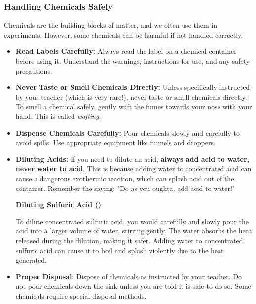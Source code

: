 \subsubsection{Handling Chemicals Safely}

Chemicals are the building blocks of matter, and we often use them in experiments. However, some chemicals can be harmful if not handled correctly.

\begin{itemize}
    \item \textbf{Read Labels Carefully:}  Always read the label on a chemical container before using it. Understand the warnings, instructions for use, and any safety precautions.
    \item \textbf{Never Taste or Smell Chemicals Directly:}  Unless specifically instructed by your teacher (which is very rare!), never taste or smell chemicals directly.  To smell a chemical safely, gently waft the fumes towards your nose with your hand. This is called \textit{wafting}.
    \item \textbf{Dispense Chemicals Carefully:}  Pour chemicals slowly and carefully to avoid spills. Use appropriate equipment like funnels and droppers.
    \item \textbf{Diluting Acids:} If you need to dilute an acid, \textbf{always add acid to water, never water to acid}. This is because adding water to concentrated acid can cause a dangerous exothermic reaction, which can splash acid out of the container. Remember the saying: "Do as you oughta, add acid to water!"
    \begin{example}
        \textbf{Diluting Sulfuric Acid ()}

        To dilute concentrated sulfuric acid, you would carefully and slowly pour the acid into a larger volume of water, stirring gently.  The water absorbs the heat released during the dilution, making it safer.  Adding water to concentrated sulfuric acid can cause it to boil and splash violently due to the heat generated.
    \end{example}
    \item \textbf{Proper Disposal:}  Dispose of chemicals as instructed by your teacher. Do not pour chemicals down the sink unless you are told it is safe to do so.  Some chemicals require special disposal methods.
\end{itemize}

